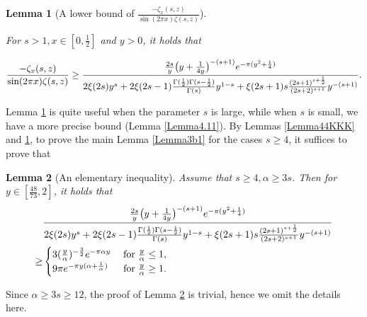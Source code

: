 \documentclass[reqno,english]{amsart}
\newtheorem{lemma}{Lemma}[section]
\newtheorem{open problem}{Open Problem}[section]
\newtheorem{open question}{Open Question}[section]
\newtheorem{open questions on hexagonal lattice}{Open Questions on hexagonal lattice}[section]
\begin{document}
\begin{lemma}[A lower bound of $\frac{-\zeta_x(s,z)}{\sin(2\pi x)\zeta(s,z)}$]\label{Lemma4.9}

For $s>1, x\in[0,\frac{1}{2}]$ and $y>0$, it holds that

 \begin{equation}\aligned\nonumber
\frac{-\zeta_x(s,z)}{\sin(2\pi x)\zeta(s,z)}
\geq\frac{\frac{2s}{y}
\big(
 y+\frac{1}{4y}
\big)^{-(s+1)} e^{-\pi(y^2+\frac{1}{4})}}
{2\xi(2s)y^s+
2\xi(2s-1)\frac{\Gamma(\frac{1}{2})\Gamma(s-\frac{1}{2})}{\Gamma(s)}y^{1-s}
+\xi(2s+1)s\frac{(2s+1)^{s+\frac{1}{2}}}{(2s+2)^{s+1}}y^{-(s+1)}}.
\endaligned\end{equation}


\end{lemma}
 Lemma \ref{Lemma4.9} is quite useful when the parameter $s$ is large, while when $s$ is small, we have a more precise bound (Lemma \ref{Lemma4.11}).
By Lemmas \ref{Lemma44KKK} and \ref{Lemma4.9}, to prove the main Lemma \ref{Lemma3b1} for the cases $s\geq4$, it suffices to prove that
\begin{lemma}[An elementary inequality]\label{Lemma4.10} Assume that $s\geq4, \alpha\geq3s$. Then for $y\in[\frac{48}{73},2]$, it holds that
 \begin{equation}\aligned\nonumber
&\frac{\frac{2s}{y}
\big(
 y+\frac{1}{4y}
\big)^{-(s+1)} e^{-\pi(y^2+\frac{1}{4})}}
{2\xi(2s)y^s+
2\xi(2s-1)\frac{\Gamma(\frac{1}{2})\Gamma(s-\frac{1}{2})}{\Gamma(s)}y^{1-s}
+\xi(2s+1)s\frac{(2s+1)^{s+\frac{1}{2}}}{(2s+2)^{s+1}}y^{-(s+1)}}\\
\geq&\begin{cases}
3(\frac{y}{\alpha})^{-\frac{3}{2}}e^{-\pi\alpha y}\;&\hbox{for}\;\frac{y}{\alpha}\leq1,\\
9\pi e^{-\pi y ( \alpha+\frac{1}{\alpha})}\;&\hbox{for}\;\frac{y}{\alpha}\geq1.
\end{cases}
\endaligned\end{equation}

\end{lemma}
Since $\alpha\geq 3s\geq12$, the proof of Lemma \ref{Lemma4.10} is trivial, hence we omit the details here.
\end{document}
